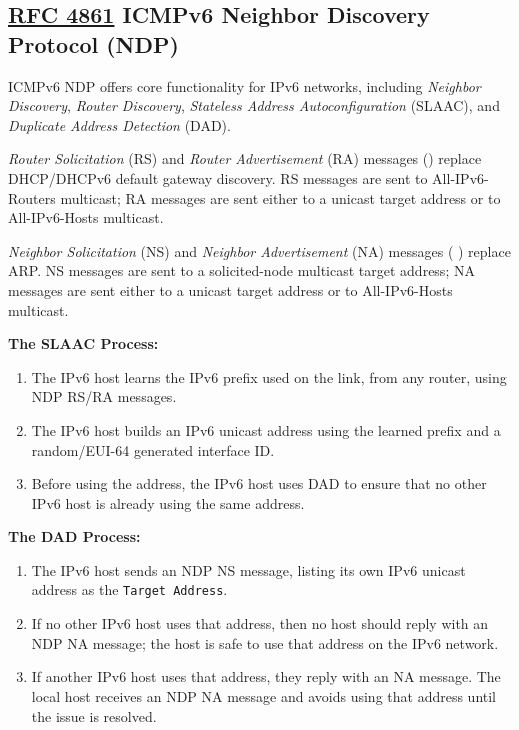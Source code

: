 \documentclass[12pt]{article}
\newcommand{\RFC}[1]{\href{https://datatracker.ietf.org/doc/html/rfc#1}{RFC #1}}
\begin{document}
	\subsection[RFC 4861 ICMPv6 NDP]{\RFC{4861} ICMPv6 Neighbor Discovery Protocol (NDP) \label{subsec:NDP}}
	ICMPv6 NDP offers core functionality for IPv6 networks, including \textit{Neighbor Discovery}, \textit{Router Discovery}, \textit{Stateless Address Autoconfiguration} (SLAAC), and \textit{Duplicate Address Detection} (DAD).

	\textit{Router Solicitation} (RS) and \textit{Router Advertisement} (RA) messages () replace DHCP/DHCPv6 default gateway discovery. RS messages are sent to All-IPv6-Routers multicast; RA messages are sent either to a unicast target address or to All-IPv6-Hosts multicast.

	\textit{Neighbor Solicitation} (NS) and \textit{Neighbor Advertisement} (NA) messages ( ) replace ARP. NS messages are sent to a solicited-node multicast target address; NA messages are sent either to a unicast target address or to All-IPv6-Hosts multicast.

	\textbf{The SLAAC Process:}
	\begin{enumerate} \itemsep -5pt
		\label{itm:NDP SLAAC}
		\item{The IPv6 host learns the IPv6 prefix used on the link, from any router, using NDP RS/RA messages.}
		\item{The IPv6 host builds an IPv6 unicast address using the learned prefix and a random/EUI-64 generated interface ID.}
		\item{Before using the address, the IPv6 host uses DAD to ensure that no other IPv6 host is already using the same address.}
	\end{enumerate}

	\textbf{The DAD Process:}
	\begin{enumerate} \itemsep -5pt
		\label{itm:NDP DAD}
		\item{The IPv6 host sends an NDP NS message, listing its own IPv6 unicast address as the \texttt{Target Address}.}
		\item{If no other IPv6 host uses that address, then no host should reply with an NDP NA message; the host is safe to use that address on the IPv6 network.}
		\item{If another IPv6 host uses that address, they reply with an NA message. The local host receives an NDP NA message and avoids using that address until the issue is resolved.}
	\end{enumerate}
\end{document}

